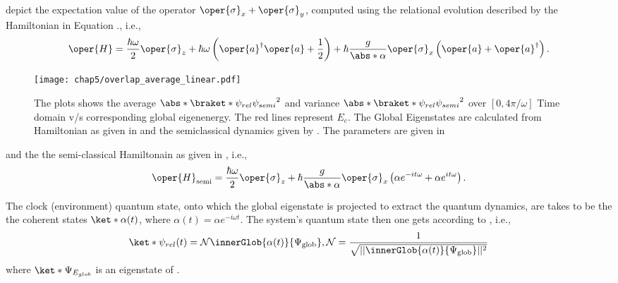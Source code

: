  depict the expectation value of the operator  \(\oper{\sigma}_x + \oper{\sigma}_y\), 
computed using the relational evolution described by the Hamiltonian in Equation ., i.e., 
\begin{eqnarray}
    \label{eq:chap5_JCM_Hamiltonian_linear}
    \oper{H} = \frac{\hbar \omega}{2} \oper{\sigma}_z + \hbar \omega \left(\oper{a}^\dagger \oper{a} + \frac{1}{2}\right) 
    + \hbar \frac{ g}{\abs*{\alpha}} \oper{\sigma}_x\left(\oper{a} + \oper{a}^\dagger\right).
\end{eqnarray}
\begin{figure}[!h]
    \centering
    \texttt{[image: chap5/overlap\_average\_linear.pdf]}
    \caption{
     The plots shows the average $\abs*{\braket*{\psi_{rel}}{\psi_{semi}}}^2$ and 
     variance $\abs*{\braket*{\psi_{rel}}{\psi_{semi}}}^2$ over \([0, 4\pi/\omega]\) Time domain v/s corresponding global eigenenergy. The red lines represent \(E_c\).
     The Global Eigenstates are calculated from 
    Hamiltonian as given in  and the semiclassical dynamics given by . The parameters 
    are given in }
     \label{fig:chap5_linear_overlap_avg}
\end{figure}
and the the semi-classical Hamiltonain as given in , i.e., 
\begin{eqnarray}
\label{eq:chap5_semi_classical_JC_Linear}
    \oper{H}_{\text{semi}} = \frac{\hbar\omega}{2} \oper{\sigma}_z 
    + \hbar \frac{g}{\abs*{\alpha}} \oper{\sigma}_x\left( \alpha e^{-it\omega} + \alpha e^{it\omega} \right).
\end{eqnarray}

The clock (environment) quantum state, onto which the global eigenstate is projected 
to extract the 
quantum dynamics, 
are takes to be the
the coherent states \(\ket*{\alpha (t)}\), where \(\alpha(t) = \alpha e^{-i\omega t}\). The system's quantum state then one gets according to , i.e.,  
\begin{equation}
    \ket*{\psi_{rel}(t)} = \mathcal{N} \innerGlob{\alpha(t)}{\Psi_{\mathrm{glob}}},
    \mathcal{N} = \frac{1}{\sqrt{\lvert \lvert \innerGlob{\alpha(t)}{\Psi_{\mathrm{glob}}} \rvert \rvert^2}}
\end{equation}
where \(\ket*{\Psi_{E_{glob}}}\) is an eigenstate of . 

